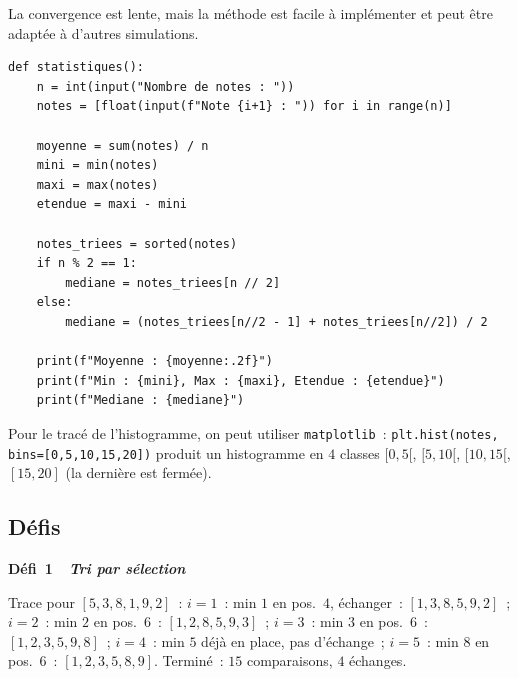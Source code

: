 La convergence est lente, mais la méthode est facile à implémenter et peut être
adaptée à d'autres simulations.


\begin{lstlisting}[style=python]
def statistiques():
    n = int(input("Nombre de notes : "))
    notes = [float(input(f"Note {i+1} : ")) for i in range(n)]
    
    moyenne = sum(notes) / n
    mini = min(notes)
    maxi = max(notes)
    etendue = maxi - mini
    
    notes_triees = sorted(notes)
    if n % 2 == 1:
        mediane = notes_triees[n // 2]
    else:
        mediane = (notes_triees[n//2 - 1] + notes_triees[n//2]) / 2
    
    print(f"Moyenne : {moyenne:.2f}")
    print(f"Min : {mini}, Max : {maxi}, Etendue : {etendue}")
    print(f"Mediane : {mediane}")
\end{lstlisting}

Pour le tracé de l'histogramme, on peut utiliser \texttt{matplotlib}~:
\texttt{plt.hist(notes, bins=[0,5,10,15,20])} produit un histogramme en $4$ classes $[0,5[$, $[5,10[$, $[10,15[$, $[15,20]$ (la derni\`ere est ferm\'ee).

\subsection*{D\'efis}

\noindent{}
{\color{BO}\bfseries\small D\'efi~1~\textendash\ \textit{Tri par s\'election}}
\par\smallskip

\begin{algorithm}[H]
\caption{Tri par s\'election}
\end{algorithm}

Trace pour $[5,3,8,1,9,2]$~:
$i=1$~: min $1$ en pos.~$4$, \'echanger~: $[1,3,8,5,9,2]$~;
$i=2$~: min $2$ en pos.~$6$~: $[1,2,8,5,9,3]$~;
$i=3$~: min $3$ en pos.~$6$~: $[1,2,3,5,9,8]$~;
$i=4$~: min $5$ d\'ej\`a en place, pas d'\'echange~;
$i=5$~: min $8$ en pos.~$6$~: $[1,2,3,5,8,9]$. Termin\'e~: $15$ comparaisons, $4$ \'echanges.

